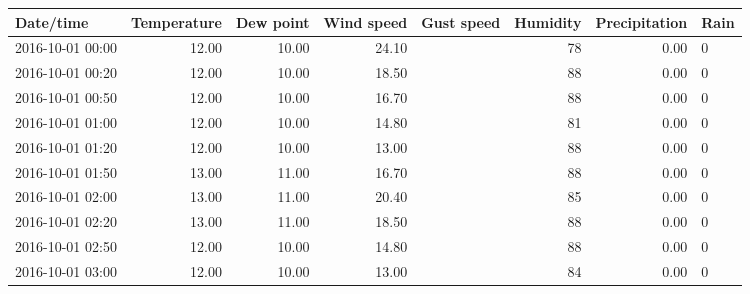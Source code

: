 \begin{tabular}{lrrrrrrl}
 Date/time & Temperature & Dew point & Wind speed & Gust speed & Humidity & Precipitation & Rain \\ 
  \hline
\hline
2016-10-01 00:00 & 12.00 & 10.00 & 24.10 &  &  78 & 0.00 & 0 \\ 
   \hline
2016-10-01 00:20 & 12.00 & 10.00 & 18.50 &  &  88 & 0.00 & 0 \\ 
   \hline
2016-10-01 00:50 & 12.00 & 10.00 & 16.70 &  &  88 & 0.00 & 0 \\ 
   \hline
2016-10-01 01:00 & 12.00 & 10.00 & 14.80 &  &  81 & 0.00 & 0 \\ 
   \hline
2016-10-01 01:20 & 12.00 & 10.00 & 13.00 &  &  88 & 0.00 & 0 \\ 
   \hline
2016-10-01 01:50 & 13.00 & 11.00 & 16.70 &  &  88 & 0.00 & 0 \\ 
   \hline
2016-10-01 02:00 & 13.00 & 11.00 & 20.40 &  &  85 & 0.00 & 0 \\ 
   \hline
2016-10-01 02:20 & 13.00 & 11.00 & 18.50 &  &  88 & 0.00 & 0 \\ 
   \hline
2016-10-01 02:50 & 12.00 & 10.00 & 14.80 &  &  88 & 0.00 & 0 \\ 
   \hline
2016-10-01 03:00 & 12.00 & 10.00 & 13.00 &  &  84 & 0.00 & 0 \\ 
  \end{tabular}
